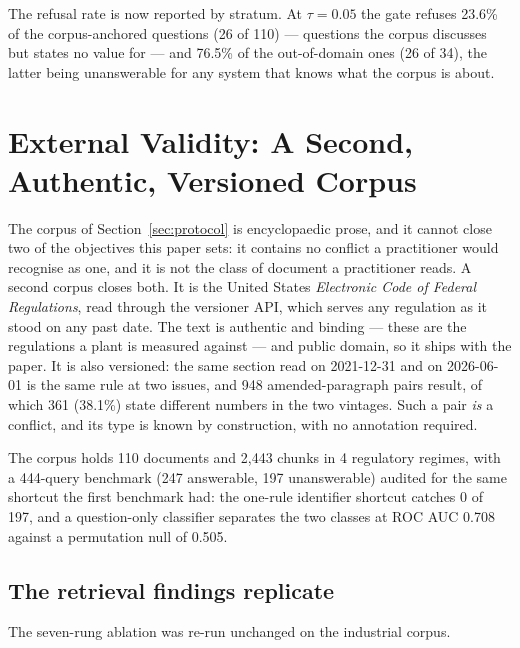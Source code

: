 \documentclass[conference]{IEEEtran}
\begin{document}
The refusal rate is now reported by stratum. At $\tau = 0.05$ the gate
refuses 23.6\% of the corpus-anchored questions
(26 of 110) --- questions the corpus discusses but states no
value for --- and 76.5\% of the out-of-domain ones
(26 of 34), the latter being unanswerable for any system that
knows what the corpus is about.

\section{External Validity: A Second, Authentic, Versioned Corpus}
\label{sec:industrial}

The corpus of Section~\ref{sec:protocol} is encyclopaedic prose, and it
cannot close two of the objectives this paper sets: it contains no conflict
a practitioner would recognise as one, and it is not the class of document a
practitioner reads. A second corpus closes both. It is the United States
\emph{Electronic Code of Federal Regulations}, read through the versioner
API, which serves any regulation as it stood on any past date. The text is
authentic and binding --- these are the regulations a plant is measured
against --- and public domain, so it ships with the paper. It is also
versioned: the same section read on 2021-12-31 and on
2026-06-01 is the same rule at two issues, and
948 amended-paragraph pairs result, of
which 361
(38.1\%) state different
numbers in the two vintages. Such a pair \emph{is} a conflict, and its
type is known by construction, with no annotation required.

The corpus holds 110 documents and 2,443 chunks
in 4 regulatory regimes, with a
444-query benchmark (247 answerable,
197 unanswerable) audited for the same shortcut the
first benchmark had: the one-rule identifier shortcut catches
0 of
197, and a question-only classifier separates the two
classes at ROC AUC 0.708 against a permutation null of
0.505.

\subsection{The retrieval findings replicate}

The seven-rung ablation was re-run unchanged on the industrial corpus.
\end{document}
